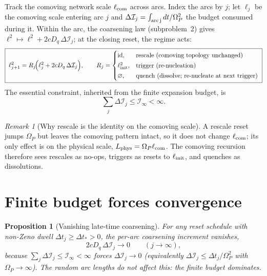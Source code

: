 \documentclass[11pt,a4paper,oneside]{book}
\newcommand{\Op}{\Omega_P}
\newcommand{\Dq}{D_q}
\newcommand{\lc}{\ell_{\rm com}}
\newcommand{\Lp}{L_{\rm phys}}
\newcommand{\Ib}{\mathcal I}
\newcommand{\linit}{\ell_{\rm init}}
\theoremstyle{plain}
\newtheorem{proposition}{Proposition}[chapter]
\theoremstyle{definition}
\theoremstyle{remark}
\newtheorem*{remark}{Remark}
\begin{document}
Track the comoving network scale $\lc$ across arcs. Index the arcs by $j$; let $\ell_j$ be the comoving
scale entering arc $j$ and $\Delta\Ib_j=\int_{\rm arc\,j}dt/\Op^2$ the budget consumed during it. Within
the arc, the coarsening law (subproblem~2) gives $\ell^2\mapsto\ell^2+2c\Dq\,\Delta\Ib_j$; at the closing
reset, the regime acts:
\begin{equation}
\boxed{\;\ell_{j+1}^{2}=R_j\!\Bigl(\ell_j^{2}+2c\Dq\,\Delta\Ib_j\Bigr),
\qquad
R_j=\begin{cases}
\mathrm{id}, & \text{rescale (comoving topology unchanged)}\\[2pt]
\linit^{2}, & \text{trigger (re-nucleation)}\\[2pt]
\varnothing, & \text{quench (dissolve; re-nucleate at next trigger)}
\end{cases}\;}
\end{equation}
The essential constraint, inherited from the finite expansion budget, is
\begin{equation}
\sum_j\Delta\Ib_j\le\Ib_\infty<\infty .
\end{equation}

\begin{remark}[Why rescale is the identity on the comoving scale]
A rescale reset jumps $\Op$ but leaves the comoving pattern intact, so it does not change $\lc$; its only
effect is on the physical scale, $\Lp=\Op\lc$. The comoving recursion therefore sees rescales as
no-ops, triggers as resets to $\linit$, and quenches as dissolutions.
\end{remark}

\section{Finite budget forces convergence}

\begin{proposition}[Vanishing late-time coarsening]\label{sawtoothfixedpoint:prop:vanish}
For any reset schedule with non-Zeno dwell $\Delta t_j\ge\Delta t_\ast>0$, the per-arc coarsening
increment vanishes,
\begin{equation}
2c\Dq\,\Delta\Ib_j\to0\qquad(j\to\infty),
\end{equation}
because $\sum_j\Delta\Ib_j\le\Ib_\infty<\infty$ forces $\Delta\Ib_j\to0$ (equivalently
$\Delta\Ib_j\le\Delta t_j/\Op^2$ with $\Op\to\infty$). The random arc lengths do not affect this:
the finite budget dominates.
\end{proposition}
\end{document}
